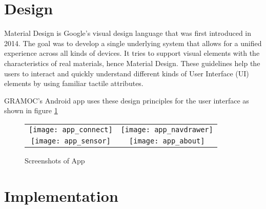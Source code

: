 \section{Design}

Material Design is Google's visual design language that was first introduced in 2014. The goal was to develop a single underlying system that allows for a unified experience across all kinds of devices. It tries to support visual elements with the characteristics of real materials, hence Material Design. These guidelines help the users to interact and quickly understand different kinds of User Interface (UI) elements by using familiar tactile attributes.

GRAMOC's Android app uses these design principles for the user interface as shown in figure \ref{fig:appscreenshots}

\begin{figure}[H]
	\centering
	\begin{tabular}{cc}
	\texttt{[image: app\_connect]}
	&
	\texttt{[image: app\_navdrawer]}
	\\
	\texttt{[image: app\_sensor]}
	&
	\texttt{[image: app\_about]}
	\end{tabular}
	\caption{Screenshots of App}
	\label{fig:appscreenshots}
\end{figure}

\section{Implementation}
